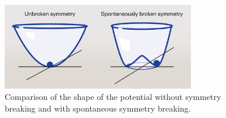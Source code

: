 \begin{figure}
	\begin{center}
	\includegraphics[width=0.75\textwidth]{fig/theory/spont_sym_breaking.jpg}
		\caption{Comparison of the shape of the potential without symmetry breaking and with spontaneous symmetry breaking.}
		\label{fig:VHiggs}
	\end{center}
\end{figure}

